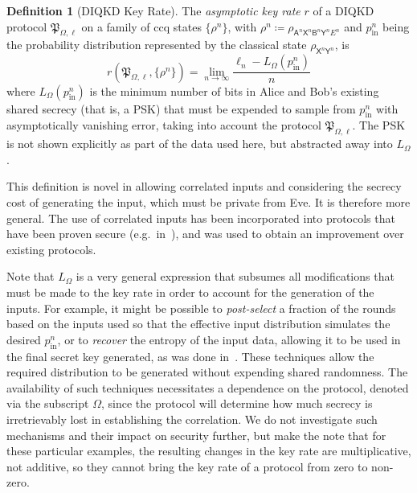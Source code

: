\documentclass[10pt, a4paper]{article}
\numberwithin{equation}{section} %
\newcounter{stmt} %
\theoremstyle{definition}
\newtheorem{defn}[stmt]{Definition}
\theoremstyle{plain}
\newcommand{\?}{\mathrel{?}} %
\newcommand{\crv}[1]{\mathsf{#1}}
\newcommand{\proto}[2][\ell]{\mathfrak{P}_{#2, #1}}
\newcommand{\prin}[1][p]{#1_{\mathrm{in}}}
\begin{document}
    \begin{defn}[DIQKD Key Rate]\label{def:diqkdkr}
      The \emph{asymptotic key rate} \(r\) of a DIQKD protocol \(\proto{\Omega}\) on a family of ccq states \({\{\rho^{n}\}}\), with \(\rho^{n} \coloneqq \rho_{\crv{A}^n\crv{X}^n \crv{B}^n\crv{Y}^n E^n}\) and \(\prin^n\) being the probability distribution represented by the classical state \(\rho_{\crv{X}^n \crv{Y}^n}\), is
      \begin{equation}
        r(\proto{\Omega}, \{\rho^n\}) = \lim_{n\to\infty} \frac{\ell_n - L_{\Omega}(\prin^n)}{n}
      \end{equation}
      where \(L_{\Omega}(\prin^n)\) is the minimum number of bits in Alice and Bob's existing shared secrecy (that is, a PSK) that must be expended to sample from \(\prin^n\) with asymptotically vanishing error, taking into account the protocol \(\proto{\Omega}\). The PSK is not shown explicitly as part of the data used here, but abstracted away into \(L_{\Omega}\).
    \end{defn}

    This definition is novel in allowing correlated inputs and considering the secrecy cost of generating the input, which must be private from Eve. It is therefore more general. The use of correlated inputs has been incorporated into protocols that have been proven secure (e.g.\ in~\cite[Prot. 2]{DIQKD_FiniteSize}), and was used to obtain an improvement over existing protocols.

    Note that \(L_{\Omega}\) is a very general expression that subsumes all modifications that must be made to the key rate in order to account for the generation of the inputs. For example, it might be possible to \emph{post-select} a fraction of the rounds based on the inputs used so that the effective input distribution simulates the desired \(\prin^n\), or to \emph{recover} the entropy of the input data, allowing it to be used in the final secret key generated, as was done in~\cite[Prot. 2]{DIQKD_FiniteSize}. These techniques allow the required distribution to be generated without expending shared randomness. The availability of such techniques necessitates a dependence on the protocol, denoted via the subscript \(\Omega\), since the protocol will determine how much secrecy is irretrievably lost in establishing the correlation. We do not investigate such mechanisms and their impact on security further, but make the note that for these particular examples, the resulting changes in the key rate are multiplicative, not additive, so they cannot bring the key rate of a protocol from zero to non-zero.
\end{document}
